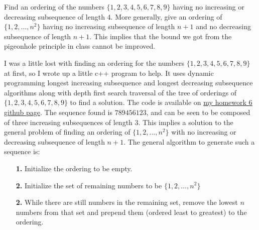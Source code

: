 \documentclass[11pt]{amsart}
\begin{document}
 
\begin{problem}

Find an ordering of the numbers $\{1,2,3,4,5,6,7,8,9\}$ having no increasing or decreasing subsequence of length $4$.  More generally, give an ordering of $\{1,2,\dots,n^2\}$ having no increasing subsequence of length $n+1$ and no decreasing subsequence of length $n+1$.  This implies that the bound we got from the pigeonhole principle in class cannot be improved.
\end{problem}
\begin{solution}

I was a little lost with finding an ordering for the numbers $\{1,2,3,4,5,6,7,8,9\}$ at first, so I wrote up a little c++ program to help.  It uses dynamic programming longest increasing subsequence and longest decreasing subsequence algorithms along with depth first search traversal of the tree of orderings of $\{1,2,3,4,5,6,7,8,9\}$ to find a solution.  The code is available on {\color{blue} \underline{\href{https://github.com/Poly1581/MATH126HW6/blob/main/NOSEQUENCE.cpp}{my homework 6 github page}}}.  The sequence found is $789456123$, and can be seen to be composed of three increasing subsequences of length 3.  This implies a solution to the general problem of finding an ordering of $\{1,2,\dots,n^2\}$ with no increasing or decreasing subsequence of length $n+1$.  The general algorithm to generate such a sequence is:
\begin{itemize}
	\item[\textbf{1.}]{} Initialize the ordering to be empty.
	\item[\textbf{2.}]{} Initialize the set of remaining numbers to be $\{1,2,\dots,n^2\}$
	\item[\textbf{2.}]{} While there are still numbers in the remaining set, remove the lowest $n$ numbers from that set and prepend them (ordered least to greatest) to the ordering.
\end{itemize}
\end{solution}
\end{document}
